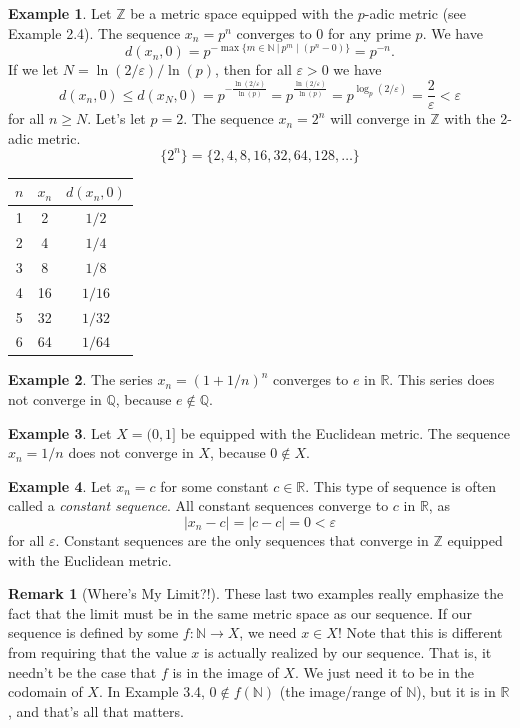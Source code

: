 \documentclass{article}
\newcommand{\N}{\mathbb{N}}
\newcommand{\R}{\mathbb{R}}
\newcommand{\Q}{\mathbb{Q}}
\newcommand{\Z}{\mathbb{Z}}
\theoremstyle{definition}
\newtheorem{example}{Example}[section]
\newtheorem{remark}{Remark}[section]
\begin{document}
\begin{example}
	Let $ \Z $ be a metric space equipped with the $ p $-adic metric (see Example 2.4). The sequence $ x_n=p^n $ converges to $ 0 $ for any prime $ p $. We have $$d(x_n,0)=p^{-\max\{ m\in\N\ |\ p^m\mid (p^n-0) \}}=p^{-n} .$$ If we let $ N=\ln(2/\varepsilon)/\ln(p) $, then for all $ \varepsilon>0 $ we have $$ d(x_n,0)\le d(x_N,0)=p^{-\frac{\ln(2/\varepsilon)}{\ln(p)}}=p^{\frac{\ln(2/\varepsilon)}{\ln(p)}}=p^{\log_p(2/\varepsilon)}=\frac{2}{\varepsilon}<\varepsilon$$ for all $ n\ge N $. Let's let $ p=2 $. The sequence $ x_n=2^n $ will converge in $ \Z $ with the 2-adic metric. $$ \{2^n\}=\{2,4,8,16,32,64,128,\ldots\}$$  
	\begin{center}
		\begin{tabular}{ccc}
			$ n $ & $ x_n $ & $ d(x_n,0) $ \\ \hline
			1 & 2     &  $ 1/2 $         \\
			2&   4   &   $ 1/4 $        \\
			3&    8  &   $ 1/8 $        \\
			4&     16 &   $ 1/16 $        \\
			5&      32&  $ 1/32 $          \\
			6&      64&       $ 1/64 $   
		\end{tabular}
	\end{center}

\end{example}
\begin{example}
	The series $ x_n=(1+1/n)^n $ converges to $ e $ in $ \R $. This series does not converge in $ \Q $, because $ e\notin\Q $. 
\end{example}
\begin{example}
	Let $ X=(0,1] $ be equipped with the Euclidean metric. The sequence $ x_n=1/n $ does not converge in $ X $, because $ 0\notin X $. 
\end{example}
\begin{example}
	Let $ x_n=c $ for some constant $ c\in\R $. This type of sequence is often called a \textit{\color{red}constant sequence}. All constant sequences converge to $ c $ in $ \R $, as $$ |x_n-c|=|c-c|=0<\varepsilon $$ for all $ \varepsilon $. Constant sequences are the only sequences that converge in $ \Z $ equipped with the Euclidean metric.
\end{example}
\begin{remark}[Where's My Limit?!]
	These last two examples really emphasize the fact that the limit must be in the same metric space as our sequence. If our sequence is defined by some $ f:\N\to X $, we need $ x\in X $! Note that this is different from requiring that the value $ x $ is actually realized by our sequence. That is, it needn't be the case that $ f $ is in the image of $ X $. We just need it to be in the codomain of $ X $. In Example 3.4, $ 0\notin f(\N) $ (the image/range of $ \N $), but it is in $ \R $, and that's all that matters. 
\end{remark}
\end{document}
